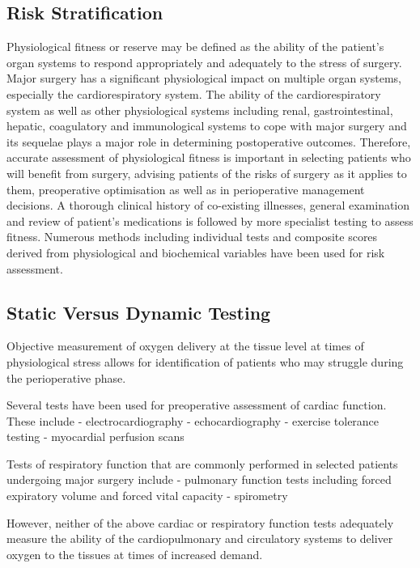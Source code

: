 \subsection{Risk Stratification}
Physiological fitness or reserve may be defined as the ability of the patient's organ systems to respond appropriately and adequately to the stress of surgery. Major surgery has a significant physiological impact on multiple organ systems, especially the cardiorespiratory system. The ability of the cardiorespiratory system as well as other physiological systems including renal, gastrointestinal, hepatic, coagulatory and immunological systems to cope with major surgery and its sequelae plays a major role in determining postoperative outcomes. Therefore, accurate assessment of physiological fitness is important in selecting patients who will benefit from surgery, advising patients of the risks of surgery as it applies to them, preoperative optimisation as well as in perioperative management decisions. A thorough clinical history of co-existing illnesses, general examination and review of patient's medications is followed by more specialist testing to assess fitness. Numerous methods including individual tests and composite scores derived from physiological and biochemical variables have been used for risk assessment.

\subsection{Static Versus Dynamic Testing}


Objective measurement of oxygen delivery at the tissue level at times of physiological stress allows for identification of patients who may struggle during the perioperative phase.

Several tests have been used for preoperative assessment of cardiac function. These include
- electrocardiography
- echocardiography
- exercise tolerance testing
- myocardial perfusion scans

Tests of respiratory function that are commonly performed in selected patients undergoing major surgery include
- pulmonary function tests including forced expiratory volume and forced vital capacity
- spirometry

However, neither of the above cardiac or respiratory function tests adequately measure the ability of the cardiopulmonary and circulatory systems to deliver oxygen to the tissues at times of increased demand.

